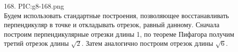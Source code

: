 168. {{PIC:g8-168.png}}\\
Будем использовать стандартные построения, позволяющее восстанавливать перпендикуляр в точке и откладывать отрезок, равный данному. Сначала построим перпендикулярные отрезки длины 1, по теореме Пифагора получим третий отрезок длины $\sqrt{2}.$ Затем аналогично построим отрезок длины $\sqrt{6}.$\\
